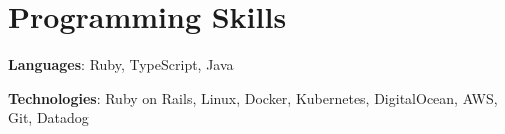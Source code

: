 \documentclass[letterpaper,11pt]{article}
\newcommand{\resumeSubHeadingListStart}{\begin{itemize}[leftmargin=*]}
\newcommand{\resumeSubHeadingListEnd}{\end{itemize}}
\begin{document}
\section{Programming Skills}
 \resumeSubHeadingListStart
   \item{
     \textbf{Languages}{: Ruby, TypeScript, Java}
     \hfill
   \item
     \textbf{Technologies}{: Ruby on Rails, Linux, Docker, Kubernetes, DigitalOcean, AWS, Git, Datadog }
   }
 \resumeSubHeadingListEnd

\end{document}

